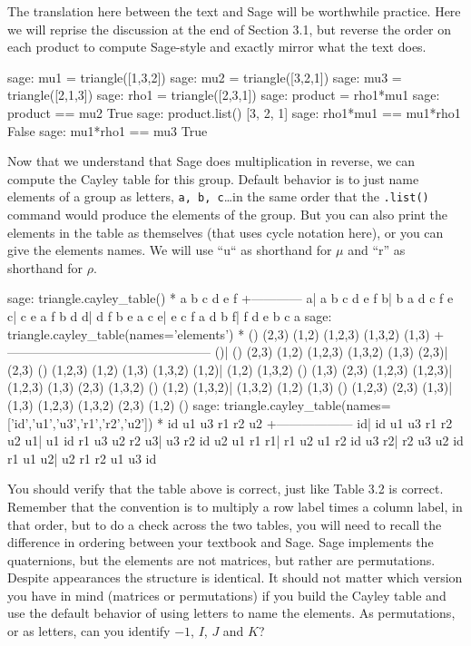 %
The translation here between the text and Sage will be worthwhile practice.  Here we will reprise the discussion at the end of Section 3.1, but reverse the order on each product to compute Sage-style and exactly mirror what the text does.
%
\begin{sageexample}
sage: mu1 = triangle([1,3,2])
sage: mu2 = triangle([3,2,1])
sage: mu3 = triangle([2,1,3])
sage: rho1 = triangle([2,3,1])
sage: product = rho1*mu1
sage: product == mu2
True
sage: product.list()
[3, 2, 1]
sage: rho1*mu1 == mu1*rho1
False
sage: mu1*rho1 == mu3
True
\end{sageexample}
%
Now that we understand that Sage does multiplication in reverse, we can compute the Cayley table for this group.  Default behavior is to just name elements of a group as letters, \verb?a, b, c?\dots in the same order that the \verb?.list()? command would produce the elements of the group.  But you can also print the elements in the table as themselves (that uses cycle notation here), or you can give the elements names.  We will use ``u`` as shorthand for $\mu$ and ``r'' as shorthand for $\rho$.
%
\begin{sageexample}
sage: triangle.cayley_table()
*  a b c d e f
 +------------
a| a b c d e f
b| b a d c f e
c| c e a f b d
d| d f b e a c
e| e c f a d b
f| f d e b c a
sage: triangle.cayley_table(names='elements')
      *       ()   (2,3)   (1,2) (1,2,3) (1,3,2)   (1,3)
       +------------------------------------------------
     ()|      ()   (2,3)   (1,2) (1,2,3) (1,3,2)   (1,3)
  (2,3)|   (2,3)      () (1,2,3)   (1,2)   (1,3) (1,3,2)
  (1,2)|   (1,2) (1,3,2)      ()   (1,3)   (2,3) (1,2,3)
(1,2,3)| (1,2,3)   (1,3)   (2,3) (1,3,2)      ()   (1,2)
(1,3,2)| (1,3,2)   (1,2)   (1,3)      () (1,2,3)   (2,3)
  (1,3)|   (1,3) (1,2,3) (1,3,2)   (2,3)   (1,2)      ()
sage: triangle.cayley_table(names=['id','u1','u3','r1','r2','u2'])
 *  id u1 u3 r1 r2 u2
  +------------------
id| id u1 u3 r1 r2 u2
u1| u1 id r1 u3 u2 r2
u3| u3 r2 id u2 u1 r1
r1| r1 u2 u1 r2 id u3
r2| r2 u3 u2 id r1 u1
u2| u2 r1 r2 u1 u3 id
\end{sageexample}
%
You should verify that the table above is correct, just like Table 3.2 is correct.  Remember that the convention is to multiply a row label times a column label, in that order, but to do a check across the two tables, you will need to recall the difference in ordering between your textbook and Sage.
%
%
Sage implements the quaternions, but the elements are not matrices, but rather are permutations.  Despite appearances the structure is identical.  It should not matter which version you have in mind (matrices or permutations) if you build the Cayley table and use the default behavior of using letters to name the elements.  As permutations, or as letters, can you identify $-1$, $I$, $J$ and $K$?
